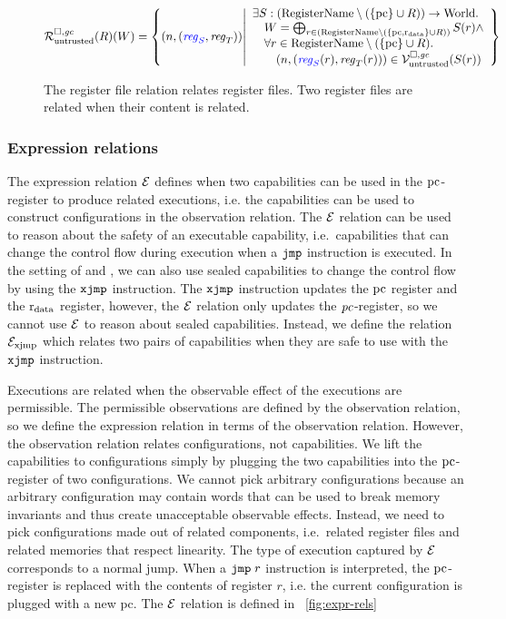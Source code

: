 \begin{jversion}
\begin{figure}
  \centering
  \[
  \lrr(R)(W) = \left\{ \npair{\stpair{\reg}{\reg}} \middle|
    \begin{array}{l}
      \exists S : (\RegName \setminus (\{\pcreg \} \cup R))\fun \World \ldotp \\
      \quad W = \bigoplus_{r \in (\RegName\setminus (\{\pcreg,\rdata \} \cup R))} S(r) \wedge \\
      \quad \forall r \in \RegName \setminus (\{\pcreg \} \cup R)\ldotp\\
      \qquad\npair{(\src{\reg_S}(r),\reg_T(r))} \in \lrv(S(r))
    \end{array}
            \right\}
\]
\caption{The register file relation relates register files. Two register files are related when their content is related.}
\label{fig:reg-file-rel}
\end{figure}

\subsubsection{Expression relations}
The expression relation $\mathcal{E}$ defines when two capabilities can be used in the $\mathrm{pc}$-register to produce related executions, i.e. the capabilities can be used to construct configurations in the observation relation.
The $\mathcal{E}$ relation can be used to reason about the safety of an executable capability, i.e.\ capabilities that can change the control flow during execution when a $\tjmp{}$ instruction is executed.
In the setting of \srccm{} and \trgcm{}, we can also use sealed capabilities to change the control flow by using the $\txjmp{}{}$ instruction.
The $\txjmp{}{}$ instruction updates the $\mathrm{pc}$ register and the $\mathrm{r}_\mathrm{data}$ register, however, the $\mathcal{E}$ relation only updates the $\mathit{pc}$-register, so we cannot use $\mathcal{E}$ to reason about sealed capabilities.
Instead, we define the relation $\mathcal{E}_\mathrm{xjmp}$ which relates two pairs of capabilities when they are safe to use with the $\txjmp{}{}$ instruction.

Executions are related when the observable effect of the executions are permissible.
The permissible observations are defined by the observation relation, so we define the expression relation in terms of the observation relation.
However, the observation relation relates configurations, not capabilities.
We lift the capabilities to configurations simply by plugging the two capabilities into the $\mathrm{pc}$-register of two configurations.
We cannot pick arbitrary configurations because an arbitrary configuration may contain words that can be used to break memory invariants and thus create unacceptable observable effects.
Instead, we need to pick configurations made out of related components, i.e.\ related register files and related memories that respect linearity.
The type of execution captured by $\mathcal{E}$ corresponds to a normal jump.
When a $\tjmp r$ instruction is interpreted, the $\mathrm{pc}$-register is replaced with the contents of register $r$, i.e. the current configuration is plugged with a new pc.
The $\mathcal{E}$ relation is defined in \figurename~\ref{fig:expr-rels}


\end{jversion}
